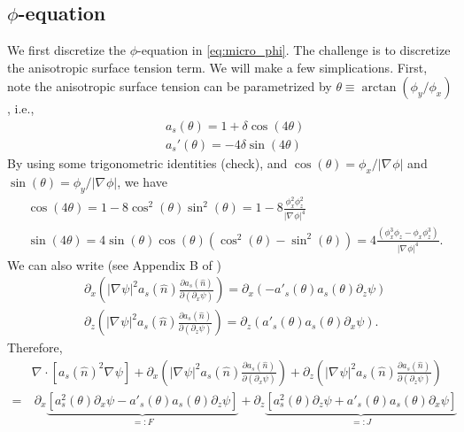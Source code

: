 \documentclass[a4paper,12pt]{article}
\renewcommand{\div}[1]{\nabla_{#1} \cdot}
\newcommand{\grad}[1]{\nabla_{#1}}
\begin{document}
\subsection{$\phi$-equation}
We first discretize the $\phi$-equation in \cref{eq:micro_phi}. The challenge is to discretize the anisotropic surface tension term. We will make a few simplications. First, note the anisotropic surface tension can be parametrized by $\theta \equiv \arctan(\phi_y / \phi_x)$, i.e., 
\begin{align}
& a_s(\theta)=  1 + \delta \cos(4 \theta) \\
& a_s'(\theta) = -4 \delta \sin(4\theta) 
\end{align}
By using some trigonometric identities (check), and $\cos(\theta) = \phi_x / |\grad{} \phi|$ and  $\sin(\theta) = \phi_y / |\grad{} \phi|$, we have
\begin{align}
& \cos(4\theta) = 1-8\cos^2(\theta) \sin^2(\theta) = 1- 8 \frac{ \phi_x^2 \phi_z^2 }{|\grad{} \phi|^4} \\
& \sin(4\theta) = 4 \sin(\theta) \cos(\theta) ( \cos^2(\theta) - \sin^2(\theta)) = 4 \frac{(\phi_x^3 \phi_z - \phi_x \phi_z^3 )}{|\grad{} \phi|^4}.
\end{align}
We can also write (see Appendix B of \cite{Tourret2015})
\begin{align}
& \partial_x \left( |\grad{} \psi|^2 a_s(\hat{n}) \frac{\partial a_s(\hat{n})}{\partial (\partial_x \psi)}  \right) = \partial_x (-a'_s(\theta) a_s(\theta) \partial_z \psi ) \\
& \partial_z \left( |\grad{} \psi|^2 a_s(\hat{n}) \frac{\partial a_s(\hat{n})}{\partial (\partial_z \psi)}  \right) = 
\partial_z (a'_s(\theta) a_s(\theta) \partial_x \psi).
\end{align}
Therefore,
\begin{align}
 & \div{} [a_s(\hat{n})^2 \grad{} \psi] +  \partial_x \left( |\grad{} \psi|^2 a_s(\hat{n}) \frac{\partial a_s(\hat{n})}{\partial (\partial_x \psi)}  \right)  +
\partial_z \left( |\grad{} \psi|^2 a_s(\hat{n}) \frac{\partial a_s(\hat{n})}{\partial (\partial_z \psi)}  \right) \nonumber \\
= &  \  \partial_x  \underbrace{ \left[ a_s^2(\theta) \partial_x \psi - a'_s(\theta) a_s(\theta) \partial_z \psi \right]}_{=: F} + 
\partial_z \underbrace{ \left[ a_s^2(\theta) \partial_z \psi + a'_s(\theta) a_s(\theta) \partial_x \psi \right]}_{=: J}  
\label{eq:aniso_surf2}
\end{align}
\end{document}
